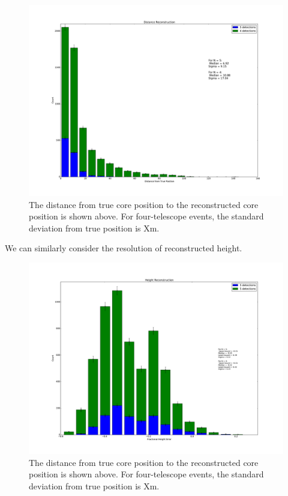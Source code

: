 \documentclass[11pt]{article}
\begin{document}
\begin{figure}
\begin{center}
\includegraphics[width=\textwidth]{position}
\caption{The distance from true core position to the reconstructed core position is shown above. For four-telescope events, the standard deviation from true position is Xm.}
\label{fig:position}
\end{center}
\end{figure}

We can similarly consider the resolution of reconstructed height.

\begin{figure}
\begin{center}
\includegraphics[width=\textwidth]{rawheight}
\caption{The distance from true core position to the reconstructed core position is shown above. For four-telescope events, the standard deviation from true position is Xm.}
\label{fig:height}
\end{center}
\end{figure}
\end{document}
